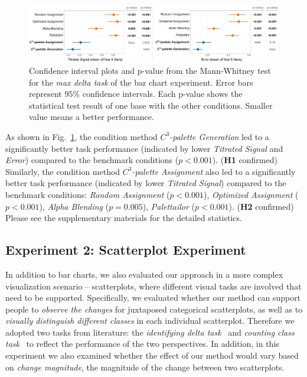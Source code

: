 {\begin{figure}[!tb]
\centering
\includegraphics[width=1\linewidth]{figures/maxdelta-results.pdf}
\caption{Confidence interval plots and p-value from the Mann-Whitney test for the \emph{max delta task} of the bar chart experiment. Error bars represent $95\%$ confidence intervals. Each p-value shows the statistical test result of one base with the other conditions. Smaller value means a better performance.}
\vspace*{-3mm}
\label{fig:barResults}
\end{figure}
As shown in Fig.~\ref{fig:barResults}, the condition method \emph{$C^3$-palette Generation} led to a significantly better task performance (indicated by lower \emph{Titrated Signal} and \emph{Error}) compared to the benchmark conditions ($p<0.001$). (\textbf{H1} confirmed)
Similarly, the condition method \emph{$C^3$-palette Assignment} also led to a significantly better task performance (indicated by lower \emph{Titrated Signal}) compared to the benchmark conditions: \emph{Random Assignment} ($p<0.001$), \emph{Optimized Assignment} ($p<0.001$), \emph{Alpha Blending} ($p=0.005$), \emph{Palettailor} ($p<0.001$). (\textbf{H2} confirmed) Please see the supplementary materials for the detailed statistics.




\subsection{Experiment 2: Scatterplot Experiment}
\label{subsec:scatterplotExp}
In addition to bar charts, we also evaluated our approach in a more complex visualization scenario -- scatterplots, where different visual tasks are involved that need to be supported.
Specifically, we evaluated whether our method can support people to \emph{observe the changes} for juxtaposed categorical scatterplots, as well as to \emph{visually distinguish different classes} in each individual scatterplot.
Therefore we adopted two tasks from literature: the \emph{identifying delta task}~\cite{Fukuba2009} and \emph{counting class task}~\cite{Lu21} to reflect the performance of the two perspectives.
In addition, in this experiment we also examined whether the effect of our method would vary based on \emph{change magnitude}, the magnitude of the change between two scatterplots.

}
